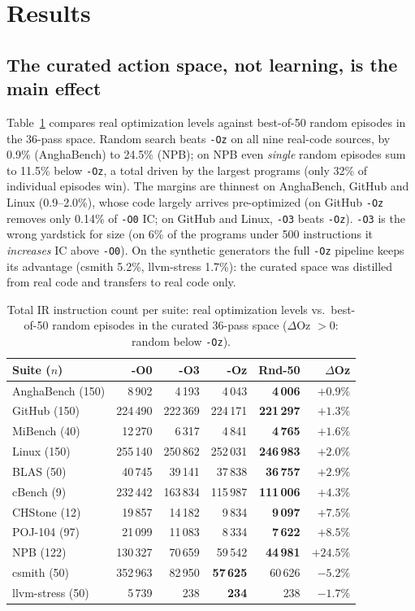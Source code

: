 \documentclass[conference,a4paper]{IEEEtran}
\begin{document}
\section{Results}

\subsection{The curated action space, not learning, is the main effect}
Table~\ref{tab:nulls} compares real optimization levels against
best-of-50 random episodes in the 36-pass space. Random search beats
\texttt{-Oz} on all nine real-code sources, by 0.9\% (AnghaBench) to
24.5\% (NPB); on NPB even \emph{single} random episodes sum to 11.5\%
below \texttt{-Oz}, a total driven by the largest programs (only 32\%
of individual episodes win). The margins are thinnest on AnghaBench, GitHub and Linux
(0.9--2.0\%), whose code largely arrives pre-optimized (on GitHub
\texttt{-Oz} removes only 0.14\% of \texttt{-O0} IC; on GitHub and
Linux, \texttt{-O3} beats \texttt{-Oz}). \texttt{-O3} is the wrong yardstick for size (on 6\% of the
programs under 500 instructions it \emph{increases} IC above
\texttt{-O0}). On the synthetic generators the full \texttt{-Oz}
pipeline keeps its advantage (csmith 5.2\%, llvm-stress 1.7\%): the
curated space was distilled from real code and transfers to real code
only.

\begin{table}[t]
\caption{Total IR instruction count per suite: real optimization levels
vs.\ best-of-50 random episodes in the curated 36-pass space
($\Delta$Oz $>0$: random below \texttt{-Oz}).}
\label{tab:nulls}
\centering
\footnotesize
\setlength{\tabcolsep}{3.5pt}
\begin{tabular}{lrrrrr}
\toprule
Suite ($n$) & -O0 & -O3 & -Oz & Rnd-50 & $\Delta$Oz \\
\midrule
AnghaBench (150) & 8\,902 & 4\,193 & 4\,043 & \textbf{4\,006} & $+0.9\%$ \\
GitHub (150)   & 224\,490 & 222\,369& 224\,171& \textbf{221\,297}& $+1.3\%$ \\
MiBench (40)   & 12\,270  & 6\,317  & 4\,841  & \textbf{4\,765}  & $+1.6\%$ \\
Linux (150)    & 255\,140 & 250\,862& 252\,031& \textbf{246\,983}& $+2.0\%$ \\
BLAS (50)      & 40\,745  & 39\,141 & 37\,838 & \textbf{36\,757} & $+2.9\%$ \\
cBench (9)     & 232\,442 & 163\,834& 115\,987& \textbf{111\,006}& $+4.3\%$ \\
CHStone (12)   & 19\,857  & 14\,182 & 9\,834  & \textbf{9\,097}  & $+7.5\%$ \\
POJ-104 (97)   & 21\,099  & 11\,083 & 8\,334  & \textbf{7\,622}  & $+8.5\%$ \\
NPB (122)      & 130\,327 & 70\,659 & 59\,542 & \textbf{44\,981} & $+24.5\%$ \\
\midrule
csmith (50)    & 352\,963 & 82\,950 & \textbf{57\,625} & 60\,626 & $-5.2\%$ \\
llvm-stress (50) & 5\,739 & 238 & \textbf{234} & 238 & $-1.7\%$ \\
\bottomrule
\end{tabular}
\end{table}
\end{document}

